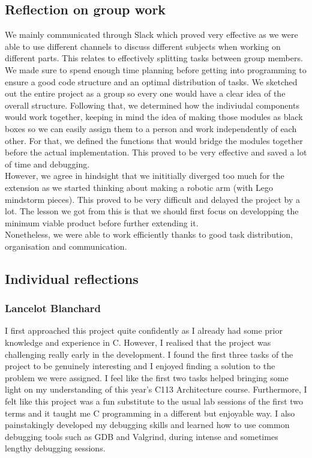 \documentclass[11pt]{article}
\begin{document}
\subsection{Reflection on group work}
We mainly communicated through Slack which proved very effective as we were able
to use different channels to discuss different subjects when working on
different parts. This relates to effectively splitting tasks between group
members. We made sure to spend enough time planning before getting into
programming to ensure a good code structure and an optimal distribution of
tasks. We sketched out the entire project as a group so every one would have a
clear idea of the overall structure. Following that, we determined how the
indiviudal components would work together, keeping in mind the idea of making
those modules as black boxes so we can easily assign them to a person and work
independently of each other. For that, we defined the functions that would
bridge the modules together before the actual implementation. This proved to be
very effective and saved a lot of time and debugging.\\

However, we agree in hindsight that we inititially diverged too much for the
extension as we started thinking about making a robotic arm (with Lego mindstorm
pieces). This proved to be very difficult and delayed the project by a lot. The
lesson we got from this is that we should first focus on developping the minimum
viable product before further extending it.\\

Nonetheless, we were able to work efficiently thanks to good task distribution,
organisation and communication.\\

\subsection{Individual reflections}
\subsubsection{Lancelot Blanchard}
I first approached this project quite confidently as I already had some prior knowledge 
and experience in C. However, I realised that the project was challenging really early in 
the development. I found the first three tasks of the project to be genuinely interesting 
and I enjoyed finding a solution to the problem we were assigned. I feel like the first two 
tasks helped bringing some light on my understanding of this year's C113 Architecture course. 
Furthermore, I felt like this project was a fun substitute to the usual lab sessions of the 
first two terms and it taught me C programming in a different but enjoyable way. I also 
painstakingly developed my debugging skills and learned how to use common debugging tools such 
as GDB and Valgrind, during intense and sometimes lengthy debugging sessions. 
\end{document}
